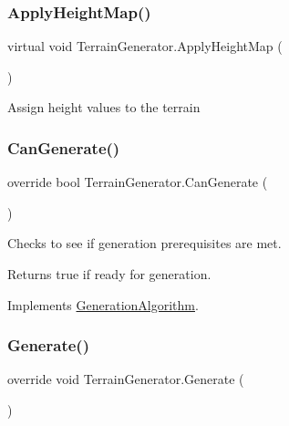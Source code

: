 \subsubsection{\texorpdfstring{Apply\+Height\+Map()}{ApplyHeightMap()}}
{\footnotesize\ttfamily virtual void Terrain\+Generator.\+Apply\+Height\+Map (\begin{DoxyParamCaption}{ }\end{DoxyParamCaption})\hspace{0.3cm}{\ttfamily [virtual]}}



Assign height values to the terrain 

\mbox{\label{class_terrain_generator_aecef659ebcfc0b012f4f8eb42e11f337}} 
\subsubsection{\texorpdfstring{Can\+Generate()}{CanGenerate()}}
{\footnotesize\ttfamily override bool Terrain\+Generator.\+Can\+Generate (\begin{DoxyParamCaption}{ }\end{DoxyParamCaption})\hspace{0.3cm}{\ttfamily [virtual]}}



Checks to see if generation prerequisites are met. 

\begin{DoxyReturn}{Returns}
true if ready for generation.
\end{DoxyReturn}


Implements \mbox{\hyperlink{class_generation_algorithm_af7d03e24e3b7fecfe2ae43f06915986d}{Generation\+Algorithm}}.

\mbox{\label{class_terrain_generator_ace92d2a3406204b124c51e91f68a0aec}} 
\subsubsection{\texorpdfstring{Generate()}{Generate()}}
{\footnotesize\ttfamily override void Terrain\+Generator.\+Generate (\begin{DoxyParamCaption}{ }\end{DoxyParamCaption})\hspace{0.3cm}{\ttfamily [virtual]}}



